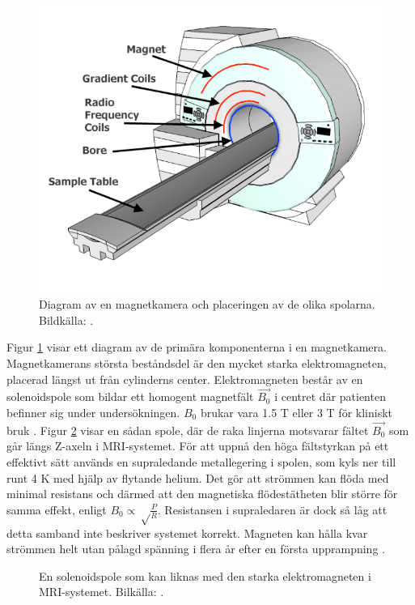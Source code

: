 \documentclass[11pt, a4paper]{article}
\begin{document}
\begin{figure}[hp]
	\centering
	\includegraphics[width=.8\textwidth]{mri_schematic}
	\caption{Diagram av en magnetkamera och placeringen av de olika spolarna. Bildkälla: \cite{fig:mri_spolar_diagram}.}
	\label{fig:mri_diagram}
\end{figure}

Figur \ref{fig:mri_diagram} visar ett diagram av de primära komponenterna i en magnetkamera. Magnetkamerans största beståndsdel är den mycket starka elektromagneten, placerad längst ut från cylinderns center. Elektromagneten består av en solenoidspole som bildar ett homogent magnetfält $\vec{B_0}$ i centret där patienten befinner sig under undersökningen. $B_0$ brukar vara 1.5 T eller 3 T för kliniskt bruk \parencite{understanding_mri}. Figur \ref{fig:solenoid} visar en sådan spole, där de raka linjerna motsvarar fältet $\vec{B_0}$ som går längs Z-axeln i MRI-systemet. För att uppnå den höga fältstyrkan på ett effektivt sätt används en supraledande metallegering i spolen, som kyls ner till runt 4 K med hjälp av flytande helium. Det gör att strömmen kan flöda med minimal resistans och därmed att den magnetiska flödestätheten blir större för samma effekt, enligt $B_0\propto\sqrt\frac{P}{R}$. Resistansen i supraledaren är dock så låg att detta samband inte beskriver systemet korrekt. Magneten kan hålla kvar strömmen helt utan pålagd spänning i flera år efter en första upprampning \parencite{mri_for_radiologists}.

\begin{figure}[ht]
	\centering
	
	\caption{En solenoidspole som kan liknas med den starka elektromagneten i MRI-systemet. Bilkälla: \cite{fig:solenoid}.}
	\label{fig:solenoid}
\end{figure}
\end{document}
